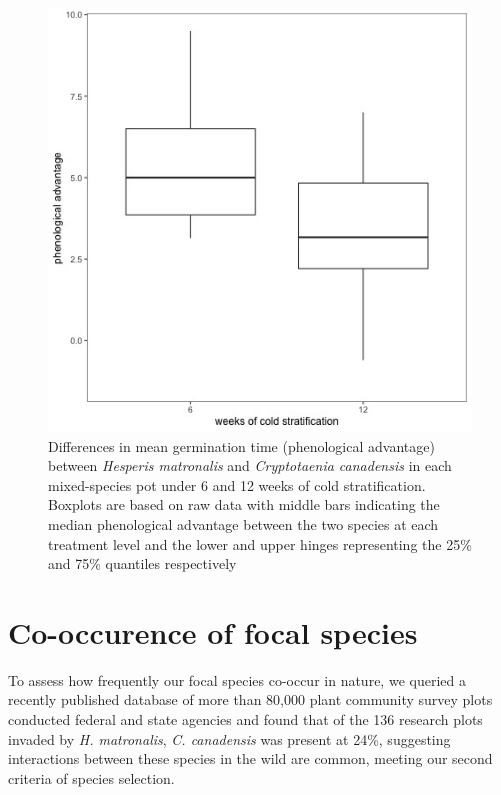 \documentclass{article}[11pt]
\begin{document}
\begin{figure}[hp]
    \centering
\includegraphics[width=.7\textwidth]{..//figure/priority_treat.jpeg}
   \caption{Differences in mean germination time (phenological advantage) between \textit{Hesperis matronalis} and \textit{Cryptotaenia canadensis} in each mixed-species pot under 6 and 12 weeks of cold stratification. Boxplots are based on raw data with middle bars indicating the median phenological advantage between the two species at each treatment level and the lower and upper hinges representing the 25\% and 75\% quantiles respectively} 
   \label{fig:MGTsup}
\end{figure}

\pagebreak
\section*{Co-occurence of focal species}

To assess how frequently our focal species co-occur in nature, we queried  a recently published database of more than 80,000 plant community survey plots conducted federal and state agencies \citep{Petri:2022tp} and found that of the 136 research plots invaded by \emph{H. matronalis}, \emph{C. canadensis} was present at 24\%, suggesting interactions between these species in the wild are common, meeting our second criteria of species selection.
\end{document}
